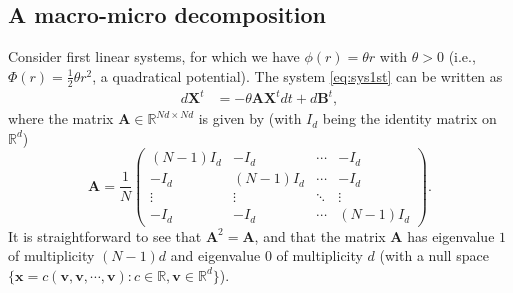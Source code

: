 \documentclass[]{elsarticle}
\def\R{\mathbb{R}}
\def\thetaOU{\theta}
\newcommand{\mbf}[1]{\boldsymbol{#1}}
\newcommand{\bx}{\mbf{x}}
\newcommand{\bB}{\mbf{B}}
\newcommand{\bX}{\mbf{X}}
\newcommand{\btheta}{\mbf{A}}
\numberwithin{equation}{section}
\numberwithin{theorem}{section}
\begin{document}
 \subsection{A macro-micro decomposition}
Consider first linear systems, for which we have $\phi(r) = \thetaOU r$ with $\thetaOU>0$ (i.e., $\Phi(r)= \frac{1}{2}\thetaOU r^2$, a quadratical potential). The system \eqref{eq:sys1st} can be written as 
\begin{align} \label{eq:OU} 
 d\bX^t&= -\thetaOU \btheta \bX^tdt +   d\bB^t,
 \end{align} 
 where the matrix $\btheta\in \R^{Nd\times Nd}$ is given by (with $I_d$ being the identity matrix on $\R^d$)
 \begin{equation} \label{matA}
\btheta = \frac{1}{N} 
 \begin{pmatrix}
  (N-1)I_d& -I_d & \cdots & -I_d  \\
-I_d  & (N-1)I_d & \cdots &-I_d \\
  \vdots  & \vdots  & \ddots & \vdots  \\
-I_d  & -I_d & \cdots & (N-1)I_d 
 \end{pmatrix}. 
 \end{equation}
It is straightforward to see that $\btheta^2= \btheta$, and that the matrix $\btheta$ has eigenvalue $1$ of multiplicity $(N-1)d$ and eigenvalue $0$ of multiplicity $d$ (with a null space $\{\bx=c (\mathbf{v,v,\cdots, v}): c\in \R, \mathbf{v}\in \R^d\}$).  
\end{document}
